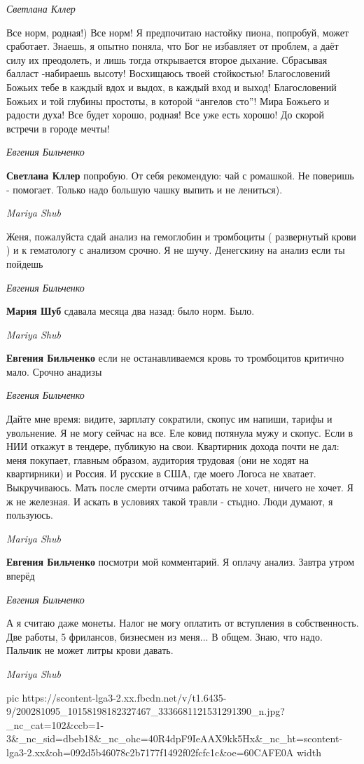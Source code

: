 \emph{Светлана Кллер}

Все норм, родная!) Все норм! Я предпочитаю настойку пиона, попробуй, может
сработает. Знаешь, я опытно поняла, что Бог не избавляет от проблем, а даёт
силу их преодолеть, и лишь тогда открывается второе дыхание. Сбрасывая балласт
-набираешь высоту! Восхищаюсь твоей стойкостью! Благословений Божьих тебе в
каждый вдох и выдох, в каждый вход и выход! Благословений Божьих и той глубины
простоты, в которой \enquote{ангелов сто}! Мира Божьего и радости духа! Все будет
хорошо, родная! Все уже есть хорошо! До скорой встречи в городе мечты!

\emph{Евгения Бильченко}

\textbf{Светлана Кллер} попробую. От себя рекомендую: чай с ромашкой. Не поверишь -
помогает. Только надо большую чашку выпить и не лениться).

\emph{Mariya Shub}

Женя, пожалуйста сдай анализ на гемоглобин и тромбоциты ( развернутый крови ) и
к гематологу с анализом срочно. Я не шучу. Денегскину на анализ если ты
пойдешь

\emph{Евгения Бильченко}

\textbf{Мария Шуб} сдавала месяца два назад: было норм. Было.

\emph{Mariya Shub}

\textbf{Евгения Бильченко} если не останавливаемся кровь то тромбоцитов критично мало. Срочно анадизы

\emph{Евгения Бильченко}

Дайте мне время: видите, зарплату сократили, скопус им напиши, тарифы и
увольнение. Я не могу сейчас на все. Еле ковид потянула мужу и скопус. Если в
НИИ откажут в тендере, публикую на свои. Квартирник дохода почти не дал: меня
покупает, главным образом, аудитория трудовая (они не ходят на квартирники) и
Россия. И русские в США, где моего Логоса не хватает. Выкручиваюсь. Мать после
смерти отчима работать не хочет, ничего не хочет. Я ж не железная. И аскать в
условиях такой травли - стыдно. Люди думают, я пользуюсь.

\emph{Mariya Shub}

\textbf{Евгения Бильченко} посмотри мой комментарий. Я оплачу анализ. Завтра
утром вперёд

\emph{Евгения Бильченко}

А я считаю даже монеты. Налог не могу оплатить от вступления в собственность.
Две работы, 5 фрилансов, бизнесмен из меня... В общем. Знаю, что надо. Пальчик
не может литры крови давать.

\emph{Mariya Shub}

\ifcmt
  pic https://scontent-lga3-2.xx.fbcdn.net/v/t1.6435-9/200281095_10158198182327467_3336681121531291390_n.jpg?_nc_cat=102&ccb=1-3&_nc_sid=dbeb18&_nc_ohc=40R4dpF9IeAAX9kk5Hx&_nc_ht=scontent-lga3-2.xx&oh=092d5b46078c2b7177f1492f02fcfc1c&oe=60CAFE0A
	width 
\fi


